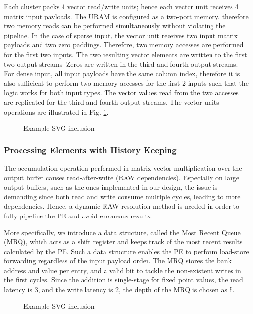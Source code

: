 \documentclass[manuscript,screen,review]{acmart}
\begin{document}
Each cluster packs 4 vector read/write units; hence each vector unit receives 4 matrix input payloads. The URAM is configured as a two-port memory, therefore two memory reads can be performed simultaneously without violating the pipeline. In the case of sparse input, the vector unit receives two input matrix payloads and two zero paddings. Therefore, two memory accesses are performed for the first two inputs. The two resulting vector elements are written to the first two output streams. Zeros are written in the third and fourth output streams. For dense input, all input payloads have the same column index, therefore it is also sufficient to perform two memory accesses for the first 2 inputs such that the logic works for both input types. The vector values read from the two accesses are replicated for the third and fourth output streams. The vector units operations are illustrated in Fig. \ref{fig:vector-unit}.

\begin{figure}[h]
	\centering
	
	\caption{Example SVG inclusion}
	\label{fig:vector-unit}
\end{figure}

\subsubsection{Processing Elements with History Keeping}
The accumulation operation performed in matrix-vector multiplication over the output buffer causes read-after-write (RAW dependencies). Especially on large output buffers, such as the ones implemented in our design, the issue is demanding since both read and write consume multiple cycles, leading to more dependencies. Hence, a dynamic RAW resolution method is needed in order to fully pipeline the PE and avoid erroneous results. 

More specifically, we introduce a data structure, called the Most Recent Queue (MRQ), which acts as a shift register and keeps track of the most recent results calculated by the PE. Such a data structure enables the PE to perform load-store forwarding \cite{hisparse,graphlily} regardless of the input payload order. The MRQ stores the bank address and value per entry, and a valid bit to tackle the non-existent writes in the first cycles. Since the addition is single-stage for fixed point values, the read latency is 3, and the write latency is 2, the depth of the MRQ is chosen as 5.

\begin{figure}[h]
	\centering
	
	\caption{Example SVG inclusion}
	\label{fig:pe}
\end{figure}
\end{document}

